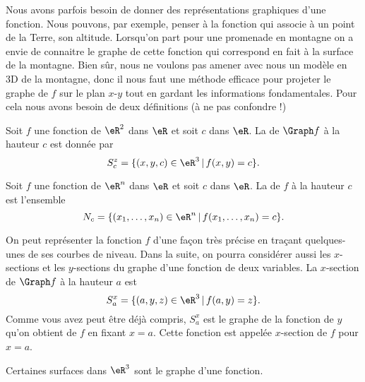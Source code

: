 Nous avons parfois besoin de donner des représentations graphiques d'une fonction. Nous pouvons, par exemple, penser à la fonction qui associe à un point de la Terre, son altitude. Lorsqu'on part pour une promenade en montagne on a envie de connaitre le graphe de cette fonction qui correspond en fait à la surface de la montagne. Bien sûr, nous ne voulons pas amener avec nous un modèle en 3D de la montagne, donc il nous faut une méthode efficace pour projeter le graphe de \( f\) sur le plan \( x\)-\( y\) tout en gardant les informations fondamentales. Pour cela nous avons besoin de deux définitions (à ne pas confondre !)
\begin{definition}
	Soit \( f\) une fonction de \( \eR^2\) dans \( \eR\) et soit \( c\) dans \( \eR\).  La  de \( \Graph f\) à la hauteur \( c\) est donnée par
	\[
		S^z_c=\{ (x,y,c)\in \eR^3\,|\, f(x,y)=c\}.
	\]
\end{definition}

\begin{definition}\label{def_niveau}
	Soit \( f\) une fonction de \( \eR^n\) dans \( \eR\) et soit \( c\) dans \( \eR\). La  de \( f\) à la hauteur \( c\) est l'ensemble
	\begin{equation}
		N_c=\{ (x_1,\ldots, x_n)\in \eR^n\,|\, f(x_1,\ldots, x_n)=c\}.
	\end{equation}
\end{definition}
On peut représenter la fonction \( f\) d'une façon très précise en traçant quelques-unes de ses courbes de niveau. Dans la suite, on pourra considérer aussi les \( x\)-sections et les \( y\)-sections du graphe d'une fonction de deux variables. La \( x\)-section de \( \Graph f\) à la hauteur \( a\) est
\[
	S^x_a=\{(a,y,z)\in\eR^3\,|\, f(a,y)=z\}.
\]
Comme vous avez peut être déjà compris, \( S^x_a\) est le graphe de la fonction de \( y\) qu'on obtient de \( f\) en fixant \( x=a\). Cette fonction est appelée \( x\)-section de \( f\) pour \( x=a\).

Certaines surfaces dans \( \eR^3\) sont le graphe d'une fonction.

